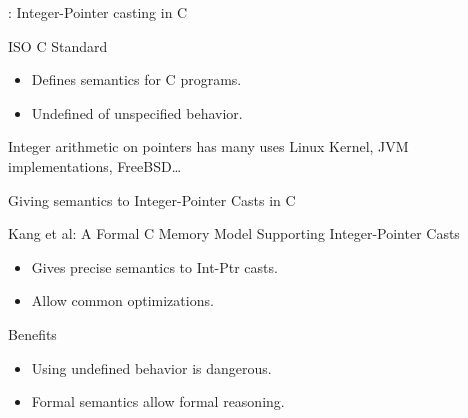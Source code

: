 \begin{frame}[fragile]{\secname : Integer-Pointer casting in C}

  \begin{minipage}{0.48\textwidth}
    
  \end{minipage}
  \begin{minipage}{0.48\textwidth}
  \begin{alertblock}{ISO C Standard}
    \begin{itemize}
    \item Defines semantics for C programs.
    \item Undefined of unspecified behavior.
    \end{itemize}
  \end{alertblock}
  \end{minipage}
  \vfill
  \begin{exampleblock}{Integer arithmetic on pointers has many uses}
    Linux Kernel, JVM implementations, FreeBSD\dots
  \end{exampleblock}
  
\end{frame}

\begin{frame}{Giving semantics to Integer-Pointer Casts in C}

  \begin{block}{Kang et al: A Formal C Memory Model Supporting Integer-Pointer Casts}
    \begin{itemize}
    \item Gives precise semantics to Int-Ptr casts.
    \item Allow common optimizations.
    \end{itemize}
  \end{block}
  \vfill
  \begin{exampleblock}{Benefits}
    \begin{itemize}
    \item Using undefined behavior is dangerous.
    \item Formal semantics allow formal reasoning.
    \end{itemize}
  \end{exampleblock}


\end{frame}


